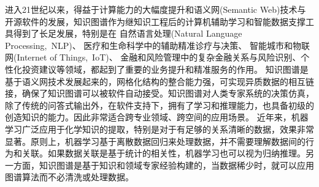 进入21世纪以来，得益于计算能力的大幅度提升和语义网\textrm{(Semantic Web)}技术与开源软件的发展，知识图谱作为继知识工程后的计算机辅助学习和智能数据支撑工具得到了长足发展，特别是在%
自然语言处理\textrm{(Natural Language Processing,~NLP)}、%
医疗和生命科学中的辅助精准诊疗与决策、%
智能城市和物联网\textrm{(Internet of Things,~IoT)}、%
金融和风险管理中的复杂金融关系与风险识别、个性化投资建议等领域，都起到了重要的业务提升和精准服务的作用。%
知识图谱是基于语义网技术发展起来的，网格化结构的整合能力强，可实现异质数据的相互链接，确保了知识图谱可以被软件自动接受。知识图谱对人类专家系统的决策仿真，除了传统的问答式输出外，在软件支持下，拥有了学习和推理能力，也具备初级的创造知识的能力。因此非常适合跨专业领域、跨空间的应用场景。%
近年来，机器学习广泛应用于化学知识的提取，特别是对于有足够的关系清晰的数据，效果非常显著。原则上，机器学习基于离散数据回归来处理数据，并不需要理解数据间的行为和关联。如果数据关联是基于统计的相关性，机器学习也可以视为归纳推理。另一方面，知识图谱是基于知识和领域专家经验构建的，当数据稀少时，就可以应用图谱算法而不必清洗或处理数据。

